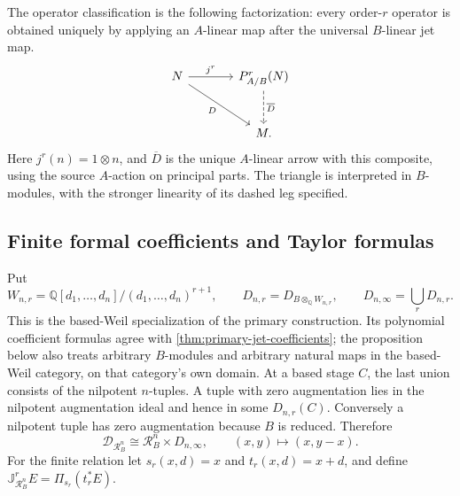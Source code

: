 \documentclass[11pt,a4paper]{article}
\numberwithin{algorithm}{section}
\numberwithin{equation}{section}
\theoremstyle{definition}
\theoremstyle{remark}
\theoremstyle{plain}
\newcommand{\QQ}{\mathbb Q}
\newcommand{\Rline}{\mathcal R_B}
\theoremstyle{definition}
\theoremstyle{plain}
\begin{document}
The operator classification is the following factorization:
every order-$r$ operator is obtained uniquely by applying an
$A$-linear map after the universal $B$-linear jet map.
\[
\begin{tikzcd}[column sep=large,row sep=large]
 N \arrow[r,"{j^r}"] \arrow[dr,"{D}"']
   & P^r_{A/B}(N) \arrow[d,dashed,"{\overline D}"]\\
 & M .
\end{tikzcd}
\]
Here $j^r(n)=1\otimes n$, and $\overline D$ is the unique
$A$-linear arrow with this composite, using the source $A$-action
on principal parts.  The triangle is interpreted in $B$-modules,
with the stronger linearity of its dashed leg specified.


\subsection{Finite formal coefficients and Taylor formulas}
Put
\[
 W_{n,r}=\QQ[d_1,\ldots,d_n]/(d_1,\ldots,d_n)^{r+1},
 \qquad D_{n,r}=D_{B\otimes_\QQ W_{n,r}},\qquad
 D_{n,\infty}=\bigcup_rD_{n,r}.
\]
This is the based-Weil specialization of the primary construction.
Its polynomial coefficient formulas agree with
\cref{thm:primary-jet-coefficients}; the proposition below also treats
arbitrary $B$-modules and arbitrary natural maps in the based-Weil
category, on that category's own domain.
At a based stage $C$, the last union consists of the nilpotent
$n$-tuples. A tuple with zero augmentation lies in the
nilpotent augmentation ideal and hence in some $D_{n,r}(C)$.
Conversely a nilpotent tuple has zero augmentation because
$B$ is reduced. Therefore
\begin{equation}\label{eq:formal-affine}
 \mathcal D_{\Rline^n}\cong\Rline^n\times D_{n,\infty},
 \qquad (x,y)\longmapsto(x,y-x).
\end{equation}
For the finite relation let $s_r(x,d)=x$ and $t_r(x,d)=x+d$,
and define $\mathbb J_{\Rline^n}^rE=\Pi_{s_r}(t_r^*E)$.
\end{document}
